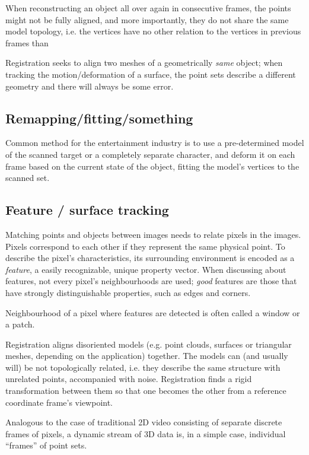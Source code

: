 When reconstructing an object all over again in consecutive frames, the points might not be fully aligned, and more importantly, they do not share the same model topology, i.e. the vertices have no other relation to the vertices in previous frames than 

Registration seeks to align two meshes of a geometrically \textit{same} object; when tracking the motion/deformation of a surface, the point sets describe a different geometry and there will always be some error.

\subsection{Remapping/fitting/something}

Common method for the entertainment industry is to use a pre-determined model of the scanned target or a completely separate character, and deform it on each frame based on the current state of the object, fitting the model's vertices to the scanned set.

\subsection{Feature / surface tracking}

Matching points and objects between images needs to relate pixels in the images.
Pixels correspond to each other if they represent the same physical point.
To describe the pixel's characteristics, its surrounding environment is encoded as a \textit{feature}, a easily recognizable, unique property vector.
When discussing about features, not every pixel's neighbourhoods are used; \textit{good} features are those that have strongly distinguishable properties, such as edges and corners.

Neighbourhood of a pixel where features are detected is often called a window or a patch.

Registration aligns disoriented models (e.g. point clouds, surfaces or triangular meshes, depending on the application) together. The models can (and usually will) be not topologically related, i.e. they describe the same structure with unrelated points, accompanied with noise. Registration finds a rigid transformation between them so that one becomes the other from a reference coordinate frame's viewpoint.

Analogous to the case of traditional 2D video consisting of separate discrete frames of pixels, a dynamic stream of 3D data is, in a simple case, individual ``frames'' of point sets.

